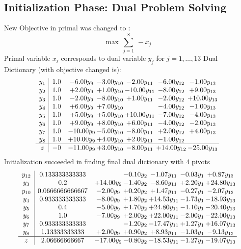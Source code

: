 \documentclass[9pt]{article}
\begin{document}
\subsection{Initialization Phase: Dual Problem Solving}
New Objective in primal was changed to : \[ \max\ \sum_{j=1}^{8}\ - x_j \] 
Primal variable $x_j$ corresponds to dual variable $y_j$ for $j = 1,\ldots,13$
Dual Dictionary (with objective changed is): 
\[\begin{array}{c| c c@{\hskip 2pt} c@{\hskip 2pt} c@{\hskip 2pt} c@{\hskip 2pt} c@{\hskip 2pt} }
 y_{1}   &  1.0 & -6.00 y_{9} & -3.00 y_{10} & -2.00 y_{11} & -6.00 y_{12} & -1.00 y_{13}\\
 y_{2}   &  1.0 & +  2.00 y_{9} & +  1.00 y_{10} & -10.00 y_{11} & -8.00 y_{12} & +  9.00 y_{13}\\
 y_{3}   &  1.0 & -2.00 y_{9} & -8.00 y_{10} & +  1.00 y_{11} & -2.00 y_{12} & + 10.00 y_{13}\\
 y_{4}   &  1.0 & +  6.00 y_{9} & +  7.00 y_{10} &   & -4.00 y_{12} & -1.00 y_{13}\\
 y_{5}   &  1.0 & +  5.00 y_{9} & +  5.00 y_{10} & + 10.00 y_{11} & -7.00 y_{12} & -4.00 y_{13}\\
 y_{6}   &  1.0 & +  9.00 y_{9} & +  8.00 y_{10} & +  6.00 y_{11} & -4.00 y_{12} & -2.00 y_{13}\\
 y_{7}   &  1.0 & -10.00 y_{9} & -5.00 y_{10} & -8.00 y_{11} & +  2.00 y_{12} & +  4.00 y_{13}\\
 y_{8}   &  1.0 & + 10.00 y_{9} & +  4.00 y_{10} & +  2.00 y_{11} & -1.00 y_{12} &   \\
\hline
z    &  -0 & -11.00 y_{9} & +  3.00 y_{10} & -8.00 y_{11} & + 14.00 y_{12} & -25.00 y_{13}\\
\end{array}\]
Initialization succeeded in finding final dual dictionary with 4 pivots
\[\begin{array}{c| c c@{\hskip 2pt} c@{\hskip 2pt} c@{\hskip 2pt} c@{\hskip 2pt} c@{\hskip 2pt} }
 y_{12}   &  0.133333333333  &   & -0.10 y_{2} & -1.07 y_{11} & -0.03 y_{1} & +  0.87 y_{13}\\
 y_{3}   &  0.2 & + 14.00 y_{9} & -1.40 y_{2} & -8.60 y_{11} & +  2.20 y_{1} & + 24.80 y_{13}\\
 y_{10}   &  0.0666666666667 & -2.00 y_{9} & +  0.20 y_{2} & +  1.47 y_{11} & -0.27 y_{1} & -2.07 y_{13}\\
 y_{4}   &  0.933333333333 & -8.00 y_{9} & +  1.80 y_{2} & + 14.53 y_{11} & -1.73 y_{1} & -18.93 y_{13}\\
 y_{5}   &  0.4 & -5.00 y_{9} & +  1.70 y_{2} & + 24.80 y_{11} & -1.10 y_{1} & -20.40 y_{13}\\
 y_{6}   &  1.0 & -7.00 y_{9} & +  2.00 y_{2} & + 22.00 y_{11} & -2.00 y_{1} & -22.00 y_{13}\\
 y_{7}   &  0.933333333333  &   & -1.20 y_{2} & -17.47 y_{11} & +  1.27 y_{1} & + 16.07 y_{13}\\
 y_{8}   &  1.13333333333 & +  2.00 y_{9} & +  0.90 y_{2} & +  8.93 y_{11} & -1.03 y_{1} & -9.13 y_{13}\\
\hline
z    &  2.06666666667 & -17.00 y_{9} & -0.80 y_{2} & -18.53 y_{11} & -1.27 y_{1} & -19.07 y_{13}\\
\end{array}\]
\end{document}
